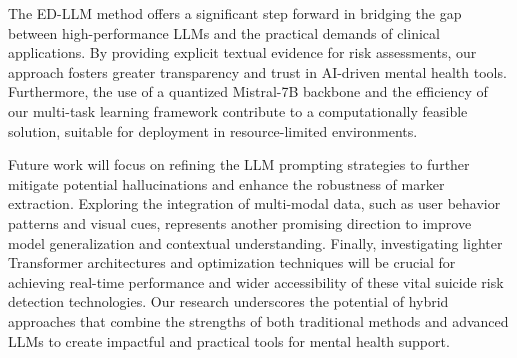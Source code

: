 The ED-LLM method offers a significant step forward in bridging the gap between high-performance LLMs and the practical demands of clinical applications. By providing explicit textual evidence for risk assessments, our approach fosters greater transparency and trust in AI-driven mental health tools. Furthermore, the use of a quantized Mistral-7B backbone and the efficiency of our multi-task learning framework contribute to a computationally feasible solution, suitable for deployment in resource-limited environments.

Future work will focus on refining the LLM prompting strategies to further mitigate potential hallucinations and enhance the robustness of marker extraction.  Exploring the integration of multi-modal data, such as user behavior patterns and visual cues, represents another promising direction to improve model generalization and contextual understanding.  Finally, investigating lighter Transformer architectures and optimization techniques will be crucial for achieving real-time performance and wider accessibility of these vital suicide risk detection technologies.  Our research underscores the potential of hybrid approaches that combine the strengths of both traditional methods and advanced LLMs to create impactful and practical tools for mental health support.


